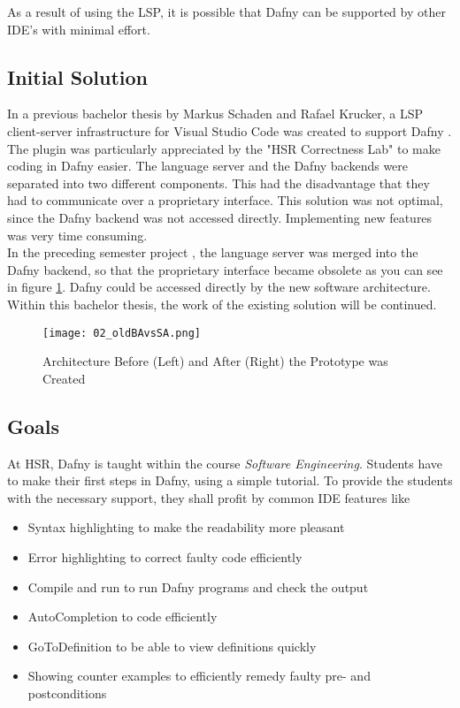 As a result of using the LSP, it is possible that Dafny can be supported by other IDE's with minimal effort.

\subsection{Initial Solution}
\label{section:management_summary:initialsolution}
In a previous bachelor thesis by Markus Schaden and Rafael Krucker, a LSP client-server infrastructure for Visual Studio Code was created to support Dafny \cite{ba}.
The plugin was particularly appreciated by the "HSR Correctness Lab" \cite{correctnessLab} to make coding in Dafny easier.
The language server and the Dafny backends were separated into two different components.
This had the disadvantage that they had to communicate over a proprietary interface.
This solution was not optimal, since the Dafny backend was not accessed directly.
Implementing new features was very time consuming. \\

In the preceding semester project \cite{sa}, the language server was merged into the Dafny backend, so that the proprietary interface became obsolete as you can see in figure \ref{fig:oldBAvsSA}.
Dafny could be accessed directly by the new software architecture.
Within this bachelor thesis, the work of the existing solution will be continued.

\begin{figure}[H]
    \centering
    \texttt{[image: 02\_oldBAvsSA.png]}
    \caption{Architecture Before (Left) and After (Right) the Prototype was Created}
    \label{fig:oldBAvsSA}
\end{figure}

\subsection{Goals}
At HSR, Dafny is taught within the course \textit{Software Engineering}.
Students have to make their first steps in Dafny, using a simple tutorial.
To provide the students with the necessary support, they shall profit by common IDE features like
\begin{itemize}
    \item Syntax highlighting to make the readability more pleasant
    \item Error highlighting to correct faulty code efficiently
    \item Compile and run to run Dafny programs and check the output
    \item AutoCompletion to code efficiently
    \item GoToDefinition to be able to view definitions quickly
    \item Showing counter examples to efficiently remedy faulty pre- and postconditions
\end{itemize}

